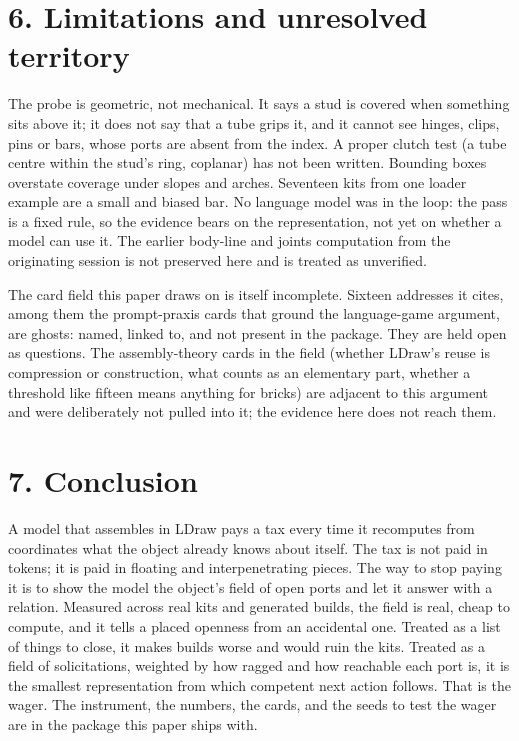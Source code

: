 \documentclass[11pt,a4paper]{article}
\begin{document}
\section*{6. Limitations and unresolved territory}
The probe is geometric, not mechanical. It says a stud is covered when something sits above it; it does not say that a tube grips it, and it cannot see hinges, clips, pins or bars, whose ports are absent from the index. A proper clutch test (a tube centre within the stud's ring, coplanar) has not been written. Bounding boxes overstate coverage under slopes and arches. Seventeen kits from one loader example are a small and biased bar. No language model was in the loop: the pass is a fixed rule, so the evidence bears on the representation, not yet on whether a model can use it. The earlier body-line and joints computation from the originating session is not preserved here and is treated as unverified.

The card field this paper draws on is itself incomplete. Sixteen addresses it cites, among them the prompt-praxis cards that ground the language-game argument, are ghosts: named, linked to, and not present in the package. They are held open as questions. The assembly-theory cards in the field (whether LDraw's reuse is compression or construction, what counts as an elementary part, whether a threshold like fifteen means anything for bricks) are adjacent to this argument and were deliberately not pulled into it; the evidence here does not reach them.

\section*{7. Conclusion}
A model that assembles in LDraw pays a tax every time it recomputes from coordinates what the object already knows about itself. The tax is not paid in tokens; it is paid in floating and interpenetrating pieces. The way to stop paying it is to show the model the object's field of open ports and let it answer with a relation. Measured across real kits and generated builds, the field is real, cheap to compute, and it tells a placed openness from an accidental one. Treated as a list of things to close, it makes builds worse and would ruin the kits. Treated as a field of solicitations, weighted by how ragged and how reachable each port is, it is the smallest representation from which competent next action follows. That is the wager. The instrument, the numbers, the cards, and the seeds to test the wager are in the package this paper ships with.
\end{document}
